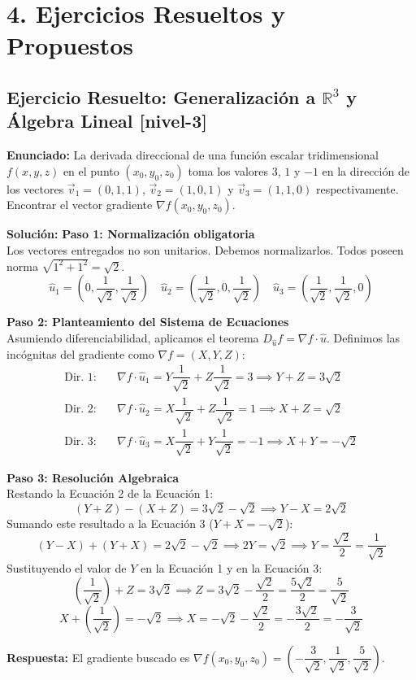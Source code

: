 \documentclass[11pt]{article}
\newenvironment{ejercicios}{%
  \section*{4. Ejercicios Resueltos y Propuestos}%
}{}
\newenvironment{ejercicioresuelto}[2]{\subsection*{Ejercicio Resuelto: #1 \small{[#2]}}}{}
\newcommand{\enunciado}[1]{\textbf{Enunciado:} #1\par\vspace{0.2cm}}
\newcommand{\solucion}[1]{\textbf{Solución:} #1\par\vspace{0.4cm}}
\begin{document}
\begin{ejercicios}
  \begin{ejercicioresuelto}{Generalización a $\mathbb{R}^3$ y Álgebra Lineal}{nivel-3}
    \enunciado{
      La derivada direccional de una función escalar tridimensional $f(x,y,z)$ en el punto $(x_0, y_0, z_0)$ toma los valores $3$, $1$ y $-1$ en la dirección de los vectores $\vec{v}_1 = (0,1,1)$, $\vec{v}_2 = (1,0,1)$ y $\vec{v}_3 = (1,1,0)$ respectivamente. Encontrar el vector gradiente $\nabla f(x_0, y_0, z_0)$.
    }
    \solucion{
      \textbf{Paso 1: Normalización obligatoria} \\
      Los vectores entregados no son unitarios. Debemos normalizarlos. Todos poseen norma $\sqrt{1^2+1^2} = \sqrt{2}$.
      $$ \hat{u}_1 = \left(0, \dfrac{1}{\sqrt{2}}, \dfrac{1}{\sqrt{2}}\right) \quad \hat{u}_2 = \left(\dfrac{1}{\sqrt{2}}, 0, \dfrac{1}{\sqrt{2}}\right) \quad \hat{u}_3 = \left(\dfrac{1}{\sqrt{2}}, \dfrac{1}{\sqrt{2}}, 0\right) $$

      \textbf{Paso 2: Planteamiento del Sistema de Ecuaciones} \\
      Asumiendo diferenciabilidad, aplicamos el teorema $D_{\hat{u}}f = \nabla f \cdot \hat{u}$. Definimos las incógnitas del gradiente como $\nabla f = (X, Y, Z)$:
      \begin{align*}
      \text{Dir. 1:} \quad & \nabla f \cdot \hat{u}_1 = Y\dfrac{1}{\sqrt{2}} + Z\dfrac{1}{\sqrt{2}} = 3 \implies Y + Z = 3\sqrt{2} \\
      \text{Dir. 2:} \quad & \nabla f \cdot \hat{u}_2 = X\dfrac{1}{\sqrt{2}} + Z\dfrac{1}{\sqrt{2}} = 1 \implies X + Z = \sqrt{2} \\
      \text{Dir. 3:} \quad & \nabla f \cdot \hat{u}_3 = X\dfrac{1}{\sqrt{2}} + Y\dfrac{1}{\sqrt{2}} = -1 \implies X + Y = -\sqrt{2}
      \end{align*}

      \textbf{Paso 3: Resolución Algebraica} \\
      Restando la Ecuación 2 de la Ecuación 1:
      $$ (Y + Z) - (X + Z) = 3\sqrt{2} - \sqrt{2} \implies Y - X = 2\sqrt{2} $$
      Sumando este resultado a la Ecuación 3 ($Y + X = -\sqrt{2}$):
      $$ (Y - X) + (Y + X) = 2\sqrt{2} - \sqrt{2} \implies 2Y = \sqrt{2} \implies Y = \dfrac{\sqrt{2}}{2} = \dfrac{1}{\sqrt{2}} $$
      Sustituyendo el valor de $Y$ en la Ecuación 1 y en la Ecuación 3:
      $$ \left(\dfrac{1}{\sqrt{2}}\right) + Z = 3\sqrt{2} \implies Z = 3\sqrt{2} - \dfrac{\sqrt{2}}{2} = \dfrac{5\sqrt{2}}{2} = \dfrac{5}{\sqrt{2}} $$
      $$ X + \left(\dfrac{1}{\sqrt{2}}\right) = -\sqrt{2} \implies X = -\sqrt{2} - \dfrac{\sqrt{2}}{2} = -\dfrac{3\sqrt{2}}{2} = -\dfrac{3}{\sqrt{2}} $$

      \textbf{Respuesta:} El gradiente buscado es $\nabla f(x_0, y_0, z_0) = \left( -\dfrac{3}{\sqrt{2}}, \dfrac{1}{\sqrt{2}}, \dfrac{5}{\sqrt{2}} \right)$.
    }
  \end{ejercicioresuelto}

\end{ejercicios}
\end{document}
